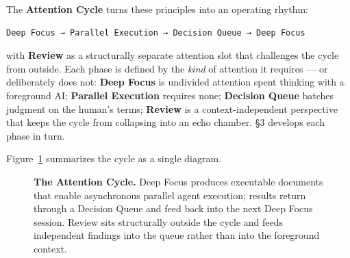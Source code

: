 \documentclass[
  nonatbib,
  preprint]{article}
\newcounter{none} %
\begin{document}
The \textbf{Attention Cycle} turns these principles into an operating
rhythm:

\begin{verbatim}
Deep Focus → Parallel Execution → Decision Queue → Deep Focus
\end{verbatim}

with \textbf{Review} as a structurally separate attention slot that
challenges the cycle from outside. Each phase is defined by the
\emph{kind} of attention it requires --- or deliberately does not:
\textbf{Deep Focus} is undivided attention spent thinking with a
foreground AI; \textbf{Parallel Execution} requires none;
\textbf{Decision Queue} batches judgment on the human's terms;
\textbf{Review} is a context-independent perspective that keeps the
cycle from collapsing into an echo chamber. §3 develops each phase in
turn.

Figure~\ref{fig:attention-cycle} summarizes the cycle as a single
diagram.

\begin{figure}[h]
\centering
{}
\caption{\textbf{The Attention Cycle.} Deep Focus produces executable documents that enable asynchronous parallel agent execution; results return through a Decision Queue and feed back into the next Deep Focus session. Review sits structurally outside the cycle and feeds independent findings into the queue rather than into the foreground context.}
\label{fig:attention-cycle}
\end{figure}
\end{document}
